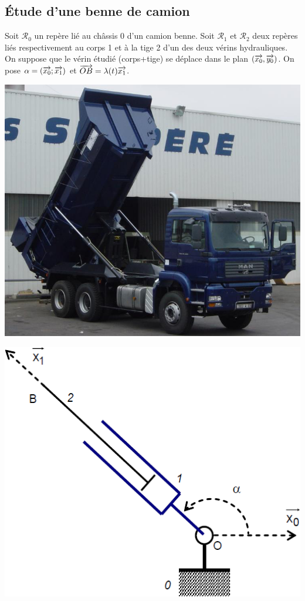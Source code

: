 \documentclass[10pt,fleqn]{article} %
\begin{document}

\vspace{8cm}
\pagestyle{fancy}
\thispagestyle{plain}


\def\columnseprulecolor{\color{ocre}}
\setlength{\columnseprule}{0.4pt} 
\begin{multicols}{2}
\section*{Étude d'une benne de camion}


Soit $\mathcal{R}_0$ un repère lié au châssis 0 d'un camion benne. Soit $\mathcal{R}_1$ et $\mathcal{R}_2$  deux repères liés respectivement au corps 1 et à la tige 2 d'un des deux vérins hydrauliques.
On suppose que le vérin étudié (corps+tige) se déplace dans le plan $(\overrightarrow{x_0},\overrightarrow{y_0})$.
On pose $\alpha=(\overrightarrow{x_0};\overrightarrow{x_1})$ et $\overrightarrow{OB}=\lambda (t)\overrightarrow{x_1}$.


\begin{center}
\includegraphics[width=.9\linewidth]{images/benne1}
\end{center}

\begin{center}
\includegraphics[width=.7\linewidth]{images/benne2}
\end{center}



\end{multicols}
\end{document}
